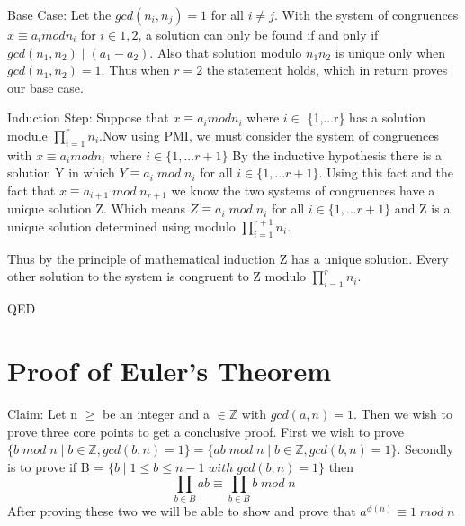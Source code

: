 \documentclass{article}
\newcommand\tab[1][1cm]{\hspace*{#1}}
\begin{document}
\tab Base Case: Let the $gcd(n_i,n_j) = 1$ for all $i \neq j $. With the system of congruences $x \equiv a_i mod n_i$ for $i \in {1,2}$, a solution can only be found if and only if $gcd(n_1,n_2) \mid (a_1-a_2)$. Also that solution modulo $n_1n_2$ is unique only when $gcd(n_1,n_2) = 1$. Thus when $r=2$ the statement holds, which in return proves our base case.

\tab Induction Step: Suppose that $x \equiv a_i mod n_i$ where $i \in$ \{1,...r\} has a solution module $\prod_{i=1}^{r} n_i $.Now using PMI, we must consider the system of congruences with  $x \equiv a_i mod n_i$  where $i \in \{1,...r+1\}$ By the inductive hypothesis there is a solution Y in which $Y \equiv a_i \; mod \; n_i$ for all $i \in \{1,...r+1\}$. Using this fact and the fact that  $x \equiv a_{i+1} \; mod \; n_{r+1}$ we know the two systems of congruences have a unique solution Z. Which means $Z \equiv a_{i} \; mod \; n_{i}$ for all $i \in \{1,...r+1\}$ and Z is a unique solution determined using modulo $\prod_{i=1}^{r+1} n_i $.

\tab Thus by the principle of mathematical induction Z has a unique solution. Every other solution to the system is congruent to Z modulo $\prod_{i=1}^{r} n_i $.


QED


\pagebreak
\section{Proof of Euler's Theorem}

Claim: Let n $\geq$ be an integer and a $\in \mathbb{Z}$ with $gcd(a,n) =1 $. Then we wish to prove three core points to get a conclusive proof. First we wish to prove $\{ b\; mod \; n \mid b \in \mathbb{Z}, gcd(b,n)=1\} = \{ab \; mod \; n \mid b \in \mathbb{Z}, gcd(b,n)=1\}$. Secondly is to prove if B = $\{b \mid 1 \leq b \leq n-1 \; with \; gcd(b,n)=1\}$ then \\
$$\prod_{ b \in B} ab  \equiv \prod_{ b \in B} b \; mod \; n $$ After proving these two we will be able to show and prove that $a^{\phi(n)} \equiv 1 \; mod \; n$
\end{document}

